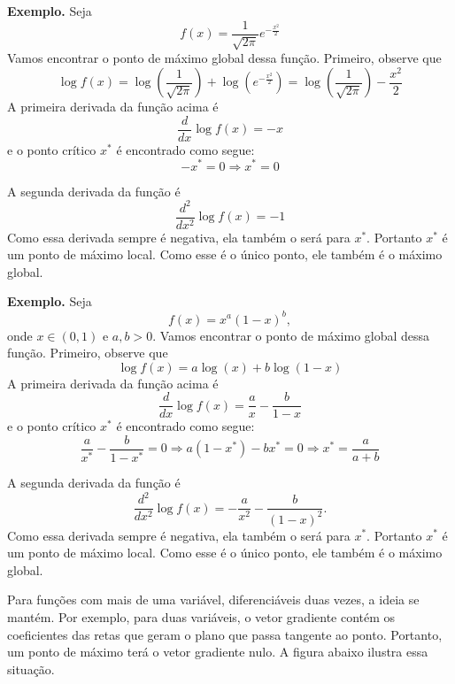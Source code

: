 \documentclass[
  letterpaper,
  DIV=11,
  numbers=noendperiod]{scrartcl}
\begin{document}
\textbf{Exemplo.} Seja \[f(x)=\frac{1}{\sqrt{2\pi}}e^{-\frac{x^2}{2}}\]
Vamos encontrar o ponto de máximo global dessa função. Primeiro, observe
que
\[\log f(x)=\log\left(\frac{1}{\sqrt{2\pi}}\right)+\log\left(e^{-\frac{x^2}{2}}\right)=\log\left(\frac{1}{\sqrt{2\pi}}\right)-\frac{x^2}{2}\]
A primeira derivada da função acima é \[\frac{d}{dx}\log f(x)=-x\] e o
ponto crítico \(x^*\) é encontrado como segue:
\[-x^*=0\Rightarrow x^*=0\]

A segunda derivada da função é \[\frac{d^2}{dx^2}\log f(x)=-1\] Como
essa derivada sempre é negativa, ela também o será para \(x^*\).
Portanto \(x^*\) é um ponto de máximo local. Como esse é o único ponto,
ele também é o máximo global.

\textbf{Exemplo.} Seja \[f(x)=x^a(1-x)^b,\] onde \(x\in(0,1)\) e
\(a,b>0\). Vamos encontrar o ponto de máximo global dessa função.
Primeiro, observe que \[\log f(x)= a\log(x)+b\log(1-x)\] A primeira
derivada da função acima é
\[\frac{d}{dx}\log f(x)=\frac{a}{x}-\frac{b}{1-x}\] e o ponto crítico
\(x^*\) é encontrado como segue:
\[\frac{a}{x^*}-\frac{b}{1-x^*}=0\Rightarrow a(1-x^*)-bx^{*}=0\Rightarrow x^*=\frac{a}{a+b}\]

A segunda derivada da função é
\[\frac{d^2}{dx^2}\log f(x)=-\frac{a}{x^2}-\frac{b}{(1-x)^2}.\] Como
essa derivada sempre é negativa, ela também o será para \(x^*\).
Portanto \(x^*\) é um ponto de máximo local. Como esse é o único ponto,
ele também é o máximo global.

Para funções com mais de uma variável, diferenciáveis duas vezes, a
ideia se mantém. Por exemplo, para duas variáveis, o vetor gradiente
contém os coeficientes das retas que geram o plano que passa tangente ao
ponto. Portanto, um ponto de máximo terá o vetor gradiente nulo. A
figura abaixo ilustra essa situação.
\end{document}
